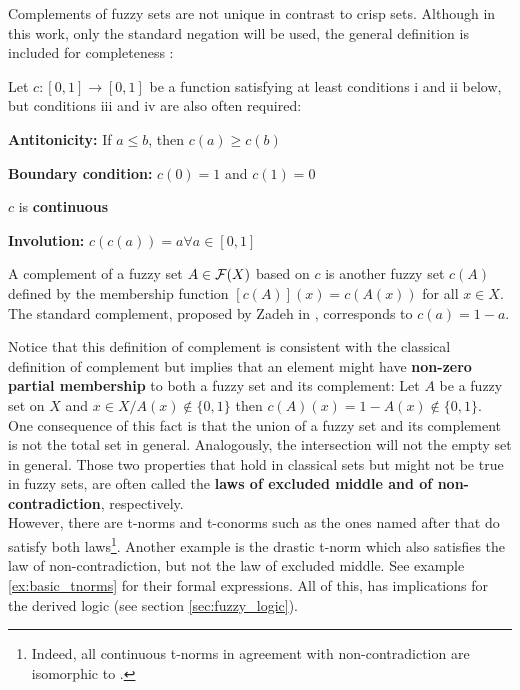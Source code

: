 Complements of fuzzy sets are not unique in contrast to crisp sets. Although in this work, only the standard negation will be used, the general definition is included for completeness \cite[p.~50]{HistoryFL2017}: 

\begin{definition}[Complement]
Let $c : [0,1] \rightarrow [0,1]$ be a function satisfying at least conditions i and ii below, but conditions iii and iv are also often required:
  \begin{romanenum}
    \item \textbf{Antitonicity:} If $a \leq b$, then $c(a) \geq c(b)$
    \item \textbf{Boundary condition:} $c(0) = 1$ and $c(1) = 0$ 
    \item $c$ is \textbf{continuous}
    \item \textbf{Involution:} $c(c(a)) = a \forall a \in [0,1]$
  \end{romanenum}
  A complement of a fuzzy set $A \in \mathcal{F}(X)$ based on $c$ is another fuzzy set $c(A)$ defined by the membership function $[c(A)](x) = c(A(x))$ for all $x \in X$.\\

  The standard complement, proposed by Zadeh in \cite{Zadeh1965}, corresponds to $c(a) = 1 - a$.
\end{definition}


Notice that this definition of complement is consistent with the classical definition of complement but implies that an element might have \textbf{non-zero partial membership} to both a fuzzy set and its complement: Let $A$ be a fuzzy set on $X$ and $x \in X / A(x)\notin \{0,1\}$ then $c( A)(x)= 1 - A(x) \notin \{0,1\}$.\\

One consequence of this fact is that the union of a fuzzy set and its complement is not the total set in general. Analogously, the intersection will not the empty set in general. Those two properties that hold in classical sets but might not be true in fuzzy sets, are often called the \textbf{laws of excluded middle and of non-contradiction}, respectively.\\

However, there are t-norms and t-conorms such as the ones named after \luka that do satisfy both laws\footnote{Indeed, all continuous t-norms in agreement with non-contradiction are isomorphic to \luka \cite[p.~7]{LukasiewiczNonContrad}.}. Another example is the drastic t-norm which also satisfies the law of non-contradiction, but not the law of excluded middle. See example \ref{ex:basic_tnorms} for their formal expressions. All of this, has implications for the derived logic (see section \ref{sec:fuzzy_logic}).\\

